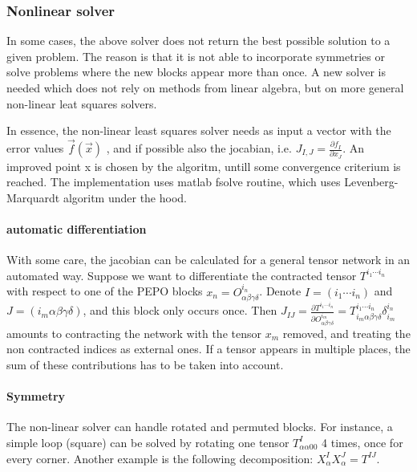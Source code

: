 \subsubsection{Nonlinear solver}

In some cases, the above solver does not return the best possible solution to a given problem. The reason is that it is not able to incorporate symmetries or solve problems where the new blocks appear more than once. A new solver is needed which does not rely on methods from linear algebra, but on more general non-linear leat squares solvers.

In essence, the non-linear least squares solver needs as input a vector with the error values $\vec{f}( \vec{x} )$ , and if possible also the jocabian, i.e. $ J_{I,J}  = \frac{ \partial f_I }{ \partial x_J } $. An improved point x is chosen by the algoritm, untill some convergence criterium is reached. The implementation uses matlab fsolve routine, which uses Levenberg-Marquardt algoritm under the hood.

\paragraph{automatic differentiation}
With some care, the jacobian can be calculated for a general tensor network in an automated way. Suppose we want to differentiate the contracted tensor $T^{i_1  \cdots i_n  }$ with respect to one of the PEPO blocks $x_n = O^{i_n }_{\alpha \beta \gamma \delta}$. Denote $I=(i_1 \cdots i_n )$ and $J=(i_m  \alpha \beta \gamma \delta)$, and this block only occurs once. Then $  J_{I J}  = \frac{\partial T^{i_1  \cdots i_n  } }{  \partial O^{i_m }_{\alpha \beta \gamma \delta} } = T^{i_1 \cdots i_n } _{ i_m  \alpha \beta \gamma \delta}  \delta^{i_n}_{i_m}   $  amounts to  contracting the network with the tensor $x_m$ removed, and treating the non contracted indices as external ones. If a tensor appears in multiple places, the sum of these contributions has to be taken into account.


\paragraph{Symmetry}

The non-linear solver can handle rotated and permuted blocks. For instance, a simple loop (square) can be solved by rotating one tensor $T^I_{ \alpha \alpha 0 0}$ 4 times, once for every corner. Another example is the following decomposition:  $  X^I_\alpha X^J_\alpha = T^{I J} $.

